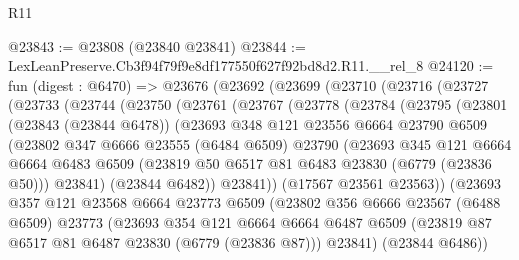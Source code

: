 \begin{lexlean}{R11}
\begin{coremodule}
@23843 := @23808 (@23840 @23841)
@23844 := LexLeanPreserve.Cb3f94f79f9e8df177550f627f92bd8d2.R11.__rel_8
@24120 := fun (digest : @6470) =>
  @23676
    (@23692
      (@23699
        (@23710
          (@23716
            (@23727
              (@23733
                (@23744
                  (@23750
                    (@23761
                      (@23767
                        (@23778
                          (@23784
                            (@23795
                              (@23801
                                (@23843 (@23844 @6478))
                                (@23693
                                  @348
                                  @121
                                  @23556
                                  @6664
                                  @23790
                                  @6509
                                  (@23802
                                    @347
                                    @6666
                                    @23555
                                    (@6484 @6509)
                                    @23790
                                    (@23693
                                      @345
                                      @121
                                      @6664
                                      @6664
                                      @6483
                                      @6509
                                      (@23819 @50 @6517 @81 @6483 @23830 (@6779 (@23836 @50)))
                                      @23841)
                                    (@23844 @6482))
                                  @23841))
                              (@17567 @23561 @23563))
                            (@23693
                              @357
                              @121
                              @23568
                              @6664
                              @23773
                              @6509
                              (@23802
                                @356
                                @6666
                                @23567
                                (@6488 @6509)
                                @23773
                                (@23693
                                  @354
                                  @121
                                  @6664
                                  @6664
                                  @6487
                                  @6509
                                  (@23819 @87 @6517 @81 @6487 @23830 (@6779 (@23836 @87)))
                                  @23841)
                                (@23844 @6486))

\end{coremodule}
\end{lexlean}
